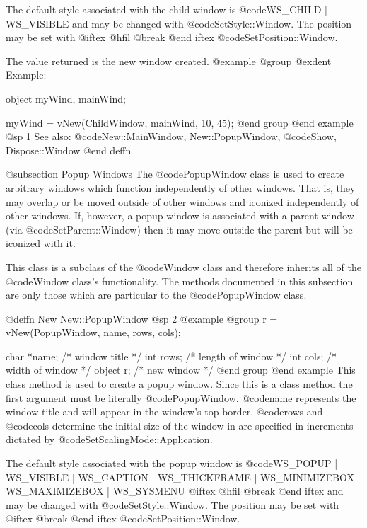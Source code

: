 The default style associated with the child window is
@code{WS_CHILD | WS_VISIBLE} and may be changed with @code{SetStyle::Window}.
The position may be set with 
@iftex
@hfil @break 
@end iftex
@code{SetPosition::Window}.

The value returned is the new window created.
@example
@group
@exdent Example:

object  myWind, mainWind;

myWind = vNew(ChildWindow, mainWind, 10, 45);
@end group
@end example
@sp 1
See also:  @code{New::MainWindow, New::PopupWindow,}
      @code{Show, Dispose::Window}
@end deffn








@subsection Popup Windows
The @code{PopupWindow} class is used to create arbitrary windows which
function independently of other windows.  That is, they may overlap or
be moved outside of other windows and iconized independently of other
windows.  If, however, a popup window is associated with a parent window
(via @code{SetParent::Window}) then it may move outside the parent but
will be iconized with it.

This class is a subclass of the @code{Window} class and therefore
inherits all of the @code{Window} class's functionality.  The methods
documented in this subsection are only those which are particular
to the @code{PopupWindow} class.






@deffn {New} New::PopupWindow
@sp 2
@example
@group
r = vNew(PopupWindow, name, rows, cols);

char    *name;  /*  window title      */
int     rows;   /*  length of window  */
int     cols;   /*  width of window   */
object  r;      /*  new window        */
@end group
@end example
This class method is used to create a popup window.  Since this is a
class method the first argument must be literally @code{PopupWindow}.
@code{name} represents the window title and will appear in the window's
top border.  @code{rows} and @code{cols} determine the initial size of
the window in are specified in increments dictated by
@code{SetScalingMode::Application}.

The default style associated with the popup window is @code{WS_POPUP |
WS_VISIBLE | WS_CAPTION | WS_THICKFRAME | WS_MINIMIZEBOX |
WS_MAXIMIZEBOX | WS_SYSMENU} 
@iftex
@hfil @break 
@end iftex
and may be changed with
@code{SetStyle::Window}.  The position may be set with
@iftex
@break 
@end iftex
@code{SetPosition::Window}.

